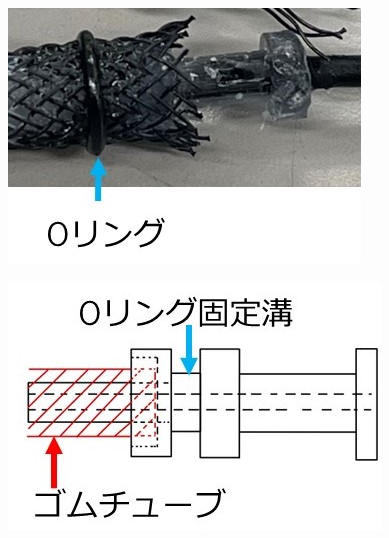 \begin{figure}[htbp]
  \begin{minipage}{0.49\hsize}
    \centering
    \includegraphics[scale=0.6]{image/MPA_tanbu_2_2.jpg}
    \label{fig:MPA_tanbu_2_1}
  \end{minipage}
  \begin{minipage}{0.499\hsize}
    \centering  
    \includegraphics[scale=0.6]{image/MPA_tanbu_2_1.jpg}
    \label{fig:MPA_tanbu_2_2}
  \end{minipage}
  

\end{figure}
